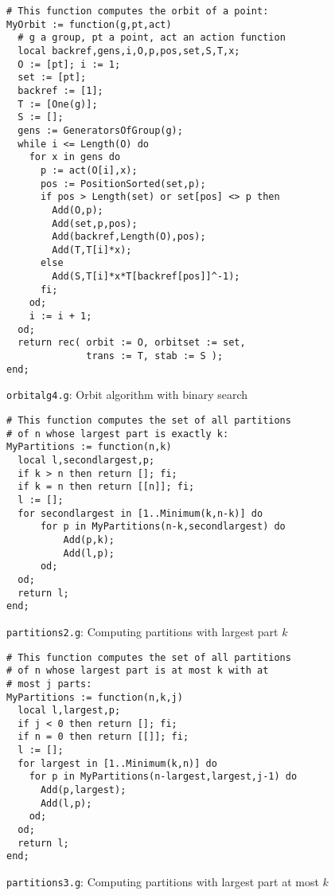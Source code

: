 \documentclass[12pt]{article}
\begin{document}
\vspace*{1cm}
\begin{center}
\begin{minipage}{5in}
\begin{verbatim}
# This function computes the orbit of a point:
MyOrbit := function(g,pt,act)
  # g a group, pt a point, act an action function
  local backref,gens,i,O,p,pos,set,S,T,x;
  O := [pt]; i := 1;
  set := [pt];
  backref := [1];
  T := [One(g)];
  S := [];
  gens := GeneratorsOfGroup(g);
  while i <= Length(O) do
    for x in gens do
      p := act(O[i],x);
      pos := PositionSorted(set,p);
      if pos > Length(set) or set[pos] <> p then
        Add(O,p);
        Add(set,p,pos);
        Add(backref,Length(O),pos);
        Add(T,T[i]*x);
      else
        Add(S,T[i]*x*T[backref[pos]]^-1);
      fi;
    od;
    i := i + 1;
  od;
  return rec( orbit := O, orbitset := set, 
              trans := T, stab := S );
end;
\end{verbatim}
\begin{center}\texttt{orbitalg4.g}: Orbit algorithm with binary search
\end{center}
\end{minipage}
\end{center}

\vspace*{1cm}
\begin{center}
\begin{minipage}{5in}
\begin{verbatim}
# This function computes the set of all partitions 
# of n whose largest part is exactly k:
MyPartitions := function(n,k)
  local l,secondlargest,p;
  if k > n then return []; fi;
  if k = n then return [[n]]; fi;
  l := [];
  for secondlargest in [1..Minimum(k,n-k)] do
      for p in MyPartitions(n-k,secondlargest) do
          Add(p,k);
          Add(l,p);
      od;
  od;
  return l;
end;
\end{verbatim}
\begin{center}\texttt{partitions2.g}: Computing partitions with largest
part $k$\end{center}
\end{minipage}
\end{center}

\vspace*{1cm}
\begin{center}
\begin{minipage}{5.1in}
\begin{verbatim}
# This function computes the set of all partitions 
# of n whose largest part is at most k with at 
# most j parts:
MyPartitions := function(n,k,j)
  local l,largest,p;
  if j < 0 then return []; fi;
  if n = 0 then return [[]]; fi;
  l := [];
  for largest in [1..Minimum(k,n)] do
    for p in MyPartitions(n-largest,largest,j-1) do
      Add(p,largest);
      Add(l,p);
    od;
  od;
  return l;
end;
\end{verbatim}
\begin{center}\texttt{partitions3.g}: Computing partitions with largest
part at most $k$\end{center}
\end{minipage}
\end{center}
\end{document}
